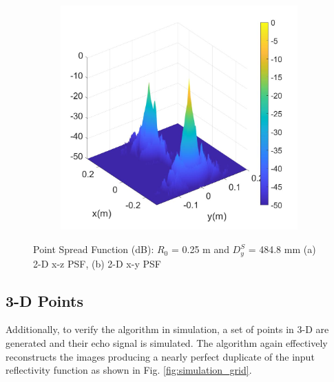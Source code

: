 \documentclass[conference]{IEEEtran}
\begin{document}
\begin{figure} [h]
\begin{subfigure}{.5\linewidth}
				\includegraphics[width=1\linewidth]{../MatlabResults/CSAR_PSFxy_R0_250_DS_478}
				\caption{}
			\end{subfigure}
			\caption{Point Spread Function (dB): $R_0$ = 0.25 m and $D^S_y$ = 484.8 mm (a) 2-D x-z PSF, (b) 2-D x-y PSF}
			\label{fig:psf}
		\end{figure}
		
		\subsection{3-D Points}
		Additionally, to verify the algorithm in simulation, a set of points in 3-D are generated and their echo signal is simulated. The algorithm again effectively reconstructs the images producing a nearly perfect duplicate of the input reflectivity function as shown in Fig. \ref{fig:simulation_grid}.
		
\end{document}
